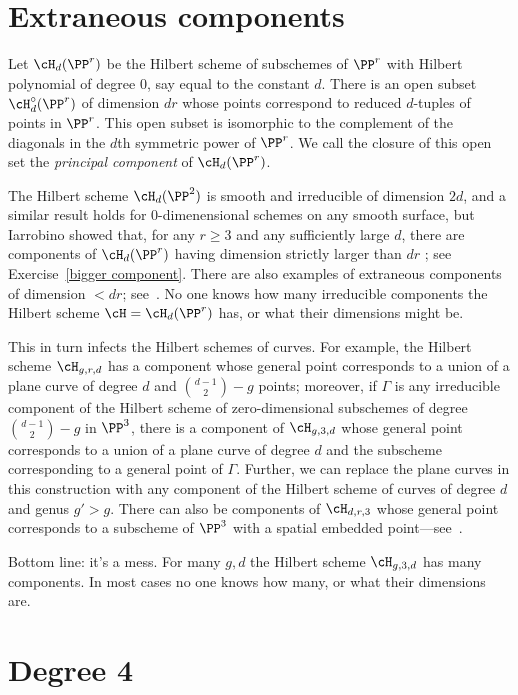 \section{Extraneous components}

 Let $\cH_d(\PP^r)$ be the Hilbert scheme of subschemes of $\PP^r$ with Hilbert polynomial of degree 0, say equal to the constant $d$. There is an open subset $\cH^\circ_d(\PP^r)$ of dimension $dr$ whose points correspond to reduced $d$-tuples of points in $\PP^r$. This open subset is isomorphic to the complement of the diagonals in the $d$th symmetric power of $\PP^r$. We call the closure of this open set the \emph{principal component} of $\cH_d(\PP^r)$. 
 
The Hilbert scheme  $\cH_d(\PP^2)$ is smooth and irreducible of dimension $2d$, and a similar result holds for 
0-dimenensional schemes on any smooth surface, but Iarrobino showed that, for any $r \geq 3$ and any sufficiently large $d$, there are components of $\cH_d(\PP^r)$ having dimension strictly larger than $dr$ \cite{Iarrobino1985}; see Exercise~\ref{bigger component}. There are also examples of extraneous components
of dimension $<dr$; see~\cite{MR2579394}. No one knows how many irreducible components the Hilbert scheme $\cH = \cH_d(\PP^r)$ has, or what their dimensions might be.

This in turn infects the Hilbert schemes of curves. For example, the Hilbert scheme $\cH_{g,r,d}$ has a component whose general point corresponds to a union of a plane curve of degree $d$ and $\binom{d-1}{2} - g$ points; moreover, if $\Gamma$ is any irreducible component of the Hilbert scheme of zero-dimensional subschemes of degree $\binom{d-1}{2} - g$ in $\PP^3$, there is a component of $\cH_{g,3,d}$ whose  general point corresponds to a union of a plane curve of degree $d$ and the subscheme corresponding to a general point of $\Gamma$. Further, we can replace the plane curves in this construction with any component of the Hilbert scheme of curves of degree $d$ and genus $g' > g$. There can also be components of $\cH_{d,r,3}$ whose general point corresponds to a subscheme of $\PP^3$ with a spatial embedded point---see~\cite{Chen-Nollet}.

Bottom line: it's a mess. For many $g,d$ the Hilbert scheme $\cH_{g,3,d}$ has many components. In most cases no one knows how many, or what their dimensions are. 

\section{Degree 4}

